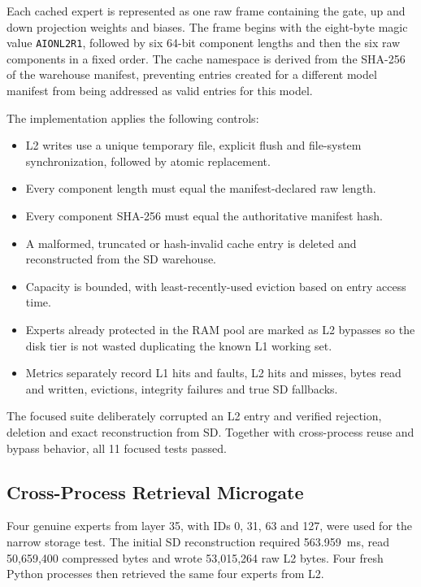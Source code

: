 Each cached expert is represented as one raw frame containing the gate, up and
down projection weights and biases.  The frame begins with the eight-byte magic
value \texttt{AIONL2R1}, followed by six 64-bit component lengths and then the
six raw components in a fixed order.  The cache namespace is derived from the
SHA-256 of the warehouse manifest, preventing entries created for a different
model manifest from being addressed as valid entries for this model.

The implementation applies the following controls:

\begin{itemize}
  \item L2 writes use a unique temporary file, explicit flush and file-system
  synchronization, followed by atomic replacement.
  \item Every component length must equal the manifest-declared raw length.
  \item Every component SHA-256 must equal the authoritative manifest hash.
  \item A malformed, truncated or hash-invalid cache entry is deleted and
  reconstructed from the SD warehouse.
  \item Capacity is bounded, with least-recently-used eviction based on entry
  access time.
  \item Experts already protected in the RAM pool are marked as L2 bypasses so
  the disk tier is not wasted duplicating the known L1 working set.
  \item Metrics separately record L1 hits and faults, L2 hits and misses, bytes
  read and written, evictions, integrity failures and true SD fallbacks.
\end{itemize}

The focused suite deliberately corrupted an L2 entry and verified rejection,
deletion and exact reconstruction from SD.  Together with cross-process reuse
and bypass behavior, all 11 focused tests passed.

\subsection{Cross-Process Retrieval Microgate}

Four genuine experts from layer 35, with IDs 0, 31, 63 and 127, were used for
the narrow storage test.  The initial SD reconstruction required 563.959~ms,
read 50,659,400 compressed bytes and wrote 53,015,264 raw L2 bytes.  Four fresh
Python processes then retrieved the same four experts from L2.

